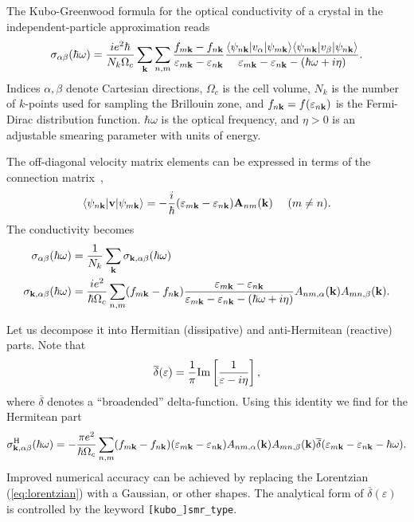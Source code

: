 The Kubo-Greenwood formula for the optical conductivity of a crystal
in the independent-particle approximation reads
%
\begin{equation}
\sigma_{\alpha\beta}(\hbar\omega)=\frac{ie^2\hbar}{N_k\Omega_c}
\sum_{\bf k}\sum_{n,m}
\frac{f_{m{\bf k}}-f_{n{\bf k}}}
     {\varepsilon_{m{\bf k}}-\varepsilon_{n{\bf k}}}
\frac{\langle\psi_{n{\bf k}}\vert v_\alpha\vert\psi_{m{\bf k}}\rangle
      \langle\psi_{m{\bf k}}\vert v_\beta\vert\psi_{n{\bf k}}\rangle}
{\varepsilon_{m{\bf k}}-\varepsilon_{n{\bf k}}-(\hbar\omega+i\eta)}.
\end{equation}
%
Indices $\alpha,\beta$ denote Cartesian directions, $\Omega_c$ is the
cell volume, $N_k$ is the number of $k$-points used for sampling the
Brillouin zone, and $f_{n{\bf k}}=f(\varepsilon_{n{\bf k}})$ is the
Fermi-Dirac distribution function. $\hbar\omega$ is the optical
frequency, and $\eta>0$ is an adjustable smearing parameter with units
of energy.

The off-diagonal velocity matrix elements can be expressed in terms of
the connection matrix~\cite{blount-ssp62},
%
\begin{equation}
\langle\psi_{n{\bf k}}\vert {\bf v} \vert\psi_{m{\bf k}}\rangle=
-\frac{i}{\hbar}(\varepsilon_{m{\bf k}}-\varepsilon_{n{\bf k}})
{\bf A}_{nm}({\bf k})\,\,\,\,\,\,\,\,(m\not= n).
\end{equation}
%
The conductivity becomes
%
\begin{align}
\label{eq:sig-bz}
\sigma_{\alpha\beta}(\hbar\omega)&=
\frac{1}{N_k}\sum_{\bf k}\sigma_{{\bf k},\alpha\beta}(\hbar\omega)\\
\label{eq:sig-k}
\sigma_{{\bf k},\alpha\beta}(\hbar\omega)&=\frac{ie^2}{\hbar\Omega_c}\sum_{n,m}
(f_{m{\bf k}}-f_{n{\bf k}})
\frac{\varepsilon_{m{\bf k}}-\varepsilon_{n{\bf k}}}
{\varepsilon_{m{\bf k}}-\varepsilon_{n{\bf k}}-(\hbar\omega+i\eta)}
A_{nm,\alpha}({\bf k})A_{mn,\beta}({\bf k}).
\end{align}

Let us decompose it into Hermitian (dissipative) and anti-Hermitean
(reactive) parts. Note that
%
\begin{equation}
\label{eq:lorentzian}
\overline{\delta}(\varepsilon)=\frac{1}{\pi}{\rm Im}
\left[\frac{1}{\varepsilon-i\eta}\right],
\end{equation}
%
where $\overline{\delta}$ denotes a ``broadended''
delta-function. Using this identity we find for the Hermitean part
%
\begin{equation}
\label{eq:sig-H}
\sigma_{{\bf k},\alpha\beta}^{\rm H}(\hbar\omega)=-\frac{\pi e^2}{\hbar\Omega_c}
\sum_{n,m}(f_{m{\bf k}}-f_{n{\bf k}})
(\varepsilon_{m{\bf k}}-\varepsilon_{n{\bf k}})
A_{nm,\alpha}({\bf k})A_{mn,\beta}({\bf k})
\overline{\delta}(\varepsilon_{m{\bf k}}-\varepsilon_{n{\bf k}}-\hbar\omega).
\end{equation}
%
Improved numerical accuracy can be achieved by replacing the
Lorentzian (\ref{eq:lorentzian}) with a Gaussian, or other shapes. The
analytical form of $\overline{\delta}(\varepsilon)$ is controlled by
the keyword {\tt [kubo\_]smr\_type}.

